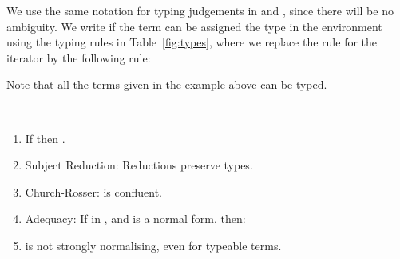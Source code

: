 \documentclass{article}
\begin{document}
We use the same notation for typing judgements in \LLCI and \LLCIrec, since there will be no ambiguity.
We write  if the term 
can be assigned the type  in the environment  using the
typing rules in Table~\ref{fig:types}, where we replace the rule for the iterator by the following rule:



Note that all the terms given in the example above can be typed.







\begin{theorem}\
\label{th:propLrec}\ 
\begin{enumerate}
\item
If  then .
\item
Subject Reduction: Reductions preserve types.
\item
Church-Rosser:  \LLCIrec is confluent.
\item
Adequacy: If  in \LLCIrec, and   is a normal form, then:\\

\item
\LLCIrec is not strongly normalising, even for typeable terms.
\end{enumerate}
\end{theorem}
\end{document}
